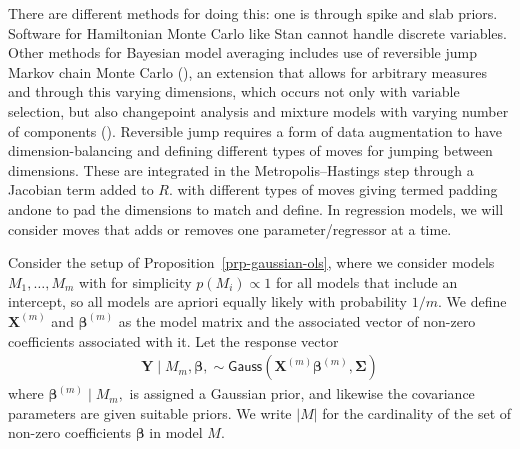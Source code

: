 \documentclass[
  11pt,
  letterpaper,
]{scrbook}
\theoremstyle{definition}
\theoremstyle{plain}
\theoremstyle{plain}
\theoremstyle{plain}
\theoremstyle{definition}
\theoremstyle{definition}
\theoremstyle{plain}
\theoremstyle{plain}
\theoremstyle{remark}
\begin{document}
There are different methods for doing this: one is through spike and
slab priors. Software for Hamiltonian Monte Carlo like Stan cannot
handle discrete variables. Other methods for Bayesian model averaging
includes use of reversible jump Markov chain Monte Carlo
(), an extension that allows for
arbitrary measures and through this varying dimensions, which occurs not
only with variable selection, but also changepoint analysis and mixture
models with varying number of components
(). Reversible jump requires a form
of data augmentation to have dimension-balancing and defining different
types of moves for jumping between dimensions. These are integrated in
the Metropolis--Hastings step through a Jacobian term added to \(R.\)
with different types of moves giving termed padding andone to pad the
dimensions to match and define. In regression models, we will consider
moves that adds or removes one parameter/regressor at a time.

Consider the setup of Proposition~\ref{prp-gaussian-ols}, where we
consider models \(M_1, \ldots, M_m\) with for simplicity
\(p(M_i)\propto 1\) for all models that include an intercept, so all
models are apriori equally likely with probability \(1/m.\) We define
\(\mathbf{X}^{(m)}\) and \(\boldsymbol{\beta}^{(m)}\) as the model
matrix and the associated vector of non-zero coefficients associated
with it. Let the response vector \begin{align*}
\boldsymbol{Y} \mid M_m, \boldsymbol{\beta}, \sim \mathsf{Gauss}(\mathbf{X}^{(m)}\boldsymbol{\beta}^{(m)}, \boldsymbol{\Sigma})    
\end{align*} where \(\boldsymbol{\beta}^{(m)} \mid M_m,\) is assigned a
Gaussian prior, and likewise the covariance parameters are given
suitable priors. We write \(|M|\) for the cardinality of the set of
non-zero coefficients \(\boldsymbol{\beta}\) in model \(M.\)
\end{document}
